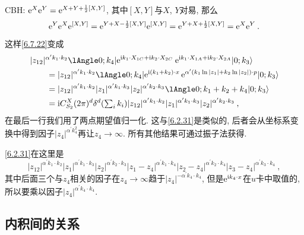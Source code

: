 \begin{tcolorbox}
	\begin{remark}
		CBH: $\mathrm{e}^X \mathrm{e}^Y=\mathrm{e}^{X+Y+\frac{1}{2}[X, Y]}$, 其中$[X, Y]$与$X$, $Y$对易, 那么
		\[
		\mathrm{e}^Y \mathrm{e}^X \mathrm{e}^{[X,Y]}= \mathrm{e}^{Y+X-\frac{1}{2}[X, Y]} \mathrm{e}^{[X,Y]} = \mathrm{e}^{Y+X+\frac{1}{2}[X, Y]} = \mathrm{e}^X \mathrm{e}^Y \:. 
		\]
		\end{remark}
\end{tcolorbox}
\noindent 这样\eqref{6.7.22}变成
\begin{align}
&|z_{12}|^{\alpha^{\prime} k_{1} \cdot k_{2}} \lAngle 0 ; k_{4}|\me^{\mi k_{1} \cdot X_{1 C}+\mi k_{2} \cdot X_{2 C}} \: 
\me^{\mi k_{1} \cdot X_{1 A}+ \mi k_{2} \cdot X_{2 A}} | 0 ; k_{3}\rangle \nonumber \\
&\qquad =|z_{12}|^{\alpha^{\prime} k_{1} \cdot k_{2}} \lAngle 0 ; k_{4}|\me^{\mi(k_{1}+k_{2}) \cdot x} \,
\me^{\alpha^{\prime}(k_{1} \ln |z_{1}|+k_{2} \ln |z_{2}|) \cdot p}| 0 ; k_{3}\rangle \nonumber \\
&\qquad  = |z_{12}|^{\alpha^{\prime} k_{1} \cdot k_{2}} |z_{1}|^{\alpha^{\prime} k_{1} \cdot k_{3}} 
 |z_{2}|^{\alpha^{\prime} k_{2} \cdot k_{3}} \lAngle0 ; k_{1}+k_{2}+k_{4} |0 ; k_{3} \rangle \nonumber \\
&\qquad =\mi C_{S_{2}}^{X}(2 \pi)^{d} \delta^{d}({\textstyle\sum_{i} k_{i}}) 
|z_{12}|^{\alpha^{\prime} k_{1} \cdot k_{2}} |z_{1}|^{\alpha^{\prime} k_{1} \cdot k_{3}} |z_{2}|^{\alpha^{\prime} k_{2} \cdot k_{3}} \:,
\label{6.7.24}
\end{align}
在最后一行我们用了两点期望值归一化. 这与\eqref{6.2.31}是类似的, 后者会从坐标系变换中得到因子$|z_{4}|^{\alpha^{\prime} k_{4}^{2}}$再让$z_{4} \rightarrow \infty $. 所有其他结果可通过振子法获得.

\begin{tcolorbox}
	\begin{remark}
		\eqref{6.2.31}在这里是
		\[
			|z_{12}|^{\alpha^{\prime} k_{1}\cdot k_{2}} |z_{1}|^{\alpha^{\prime} k_{1} \cdot k_{3}} 
			|z_{2}|^{\alpha^{\prime} k_{2} \cdot k_{3}}	|z_{1}-z_{4}|^{\alpha^{\prime} k_{1} \cdot k_{4}} 
			|z_{2}-z_{4}|^{\alpha^{\prime} k_{2} \cdot k_{4}} |z_{3}-z_{4}|^{\alpha^{\prime} k_{3} \cdot k_{4}} \:,
		\]
		其中后面三个与$z_{4}$相关的因子在$z_{4} \rightarrow \infty$趋于$|z_{4}|^{-\alpha^{\prime} k_{4} \cdot k_{4}}$, 
		但是$\mathrm{e}^{\mathrm{i} k_{4}\cdot x}$在$u$卡中取值的, 所以要乘以因子$|z_{4}|^{\alpha^{\prime} k_{4} \cdot k_{4}}$.
		\end{remark}
\end{tcolorbox}


\subsection*{内积间的关系}

